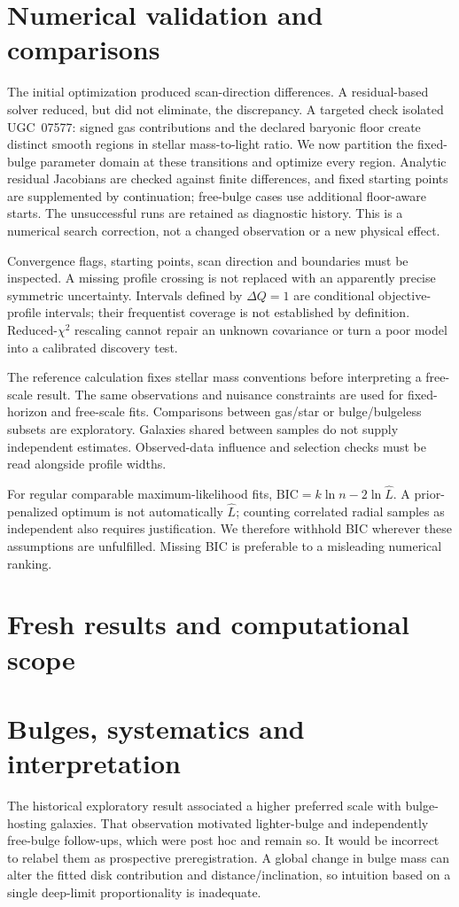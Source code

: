 \documentclass[11pt]{article}
\begin{document}
\section{Numerical validation and comparisons}
The initial optimization produced scan-direction differences. A residual-based
solver reduced, but did not eliminate, the discrepancy. A targeted check isolated
UGC~07577: signed gas contributions and the declared baryonic floor create distinct
smooth regions in stellar mass-to-light ratio. We now partition the fixed-bulge
parameter domain at these transitions and optimize every region. Analytic residual
Jacobians are checked against finite differences, and fixed starting points are
supplemented by continuation; free-bulge cases use additional floor-aware starts.
The unsuccessful runs are retained as diagnostic history. This is a numerical
search correction, not a changed observation or a new physical effect.

Convergence flags, starting points, scan direction and boundaries must be inspected. A missing profile crossing is not replaced with an apparently precise symmetric uncertainty. Intervals defined by $\Delta Q=1$ are conditional objective-profile intervals; their frequentist coverage is not established by definition. Reduced-$\chi^2$ rescaling cannot repair an unknown covariance or turn a poor model into a calibrated discovery test.

The reference calculation fixes stellar mass conventions before interpreting a free-scale result. The same observations and nuisance constraints are used for fixed-horizon and free-scale fits. Comparisons between gas/star or bulge/bulgeless subsets are exploratory. Galaxies shared between samples do not supply independent estimates. Observed-data influence and selection checks must be read alongside profile widths.

For regular comparable maximum-likelihood fits, $\mathrm{BIC}=k\ln n-2\ln\widehat L$. A prior-penalized optimum is not automatically $\widehat L$; counting correlated radial samples as independent also requires justification. We therefore withhold BIC wherever these assumptions are unfulfilled. Missing BIC is preferable to a misleading numerical ranking.

\section{Fresh results and computational scope}


\section{Bulges, systematics and interpretation}
The historical exploratory result associated a higher preferred scale with bulge-hosting galaxies. That observation motivated lighter-bulge and independently free-bulge follow-ups, which were post hoc and remain so. It would be incorrect to relabel them as prospective preregistration. A global change in bulge mass can alter the fitted disk contribution and distance/inclination, so intuition based on a single deep-limit proportionality is inadequate.
\end{document}
